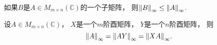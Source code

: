 \begin{property}
如果\(B\)是\(A \in M_{m \times n}(\mathbb{C})\)的一个子矩阵，
则\(\norm{B}_\infty \leq \norm{A}_\infty\).
\end{property}

\begin{property}
设\(A \in M_{m \times n}(\mathbb{C})\)，
\(X\)是一个\(m\)阶酉矩阵，
\(Y\)是一个\(n\)阶酉矩阵，
则\begin{equation}
	\norm{A}_\infty
	= \norm{AY}_\infty
	= \norm{XA}_\infty.
\end{equation}
\end{property}
